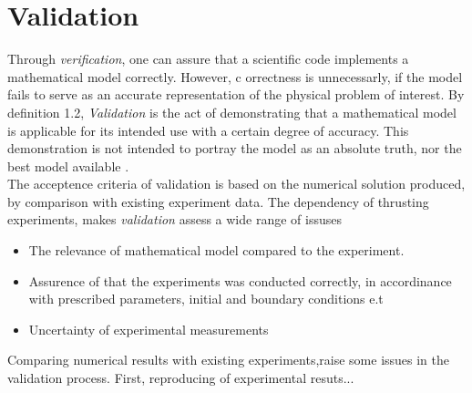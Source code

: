 \section{Validation}
Through \textit{verification}, one can assure that a scientific code implements a mathematical model correctly. However, c
orrectness is unnecessarly, if the model fails to serve as an accurate representation of the physical problem of interest. 
By definition 1.2, \textit{Validation} is the act of demonstrating that a mathematical model is applicable for its intended use with a certain degree of accuracy. This demonstration is not intended to portray the model as an absolute truth, nor the best model available \cite{Rykiel1996}. \\
The acceptence criteria of validation is based on the numerical solution produced, by comparison with existing experiment data. The dependency of thrusting experiments, makes \textit{validation} assess a wide range of issuses \cite{Sommerville2006} 
\begin{itemize}
\item The relevance of mathematical model compared to the experiment.
\item Assurence of that the experiments was conducted correctly, in accordinance with prescribed 
        parameters, initial and boundary conditions e.t
\item Uncertainty of experimental measurements
\end{itemize}

Comparing numerical results with existing experiments,raise some issues in the validation process. First, reproducing of experimental resuts...  









 

